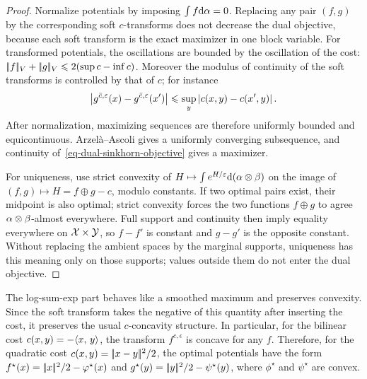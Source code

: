 \begin{proof}
	Normalize potentials by imposing $\int f\mathrm{d}\alpha=0$. Replacing any pair $(f,g)$ by the corresponding soft $c$-transforms does not decrease the dual objective, because each soft transform is the exact maximizer in one block variable. For transformed potentials, the oscillations are bounded by the oscillation of the cost:
	\(|\!| f |\!|_V+|\!| g |\!|_V \leqslant 2(\sup c-\inf c)\).
	Moreover the modulus of continuity of the soft transforms is controlled by that of $c$; for instance
	\[
		\left\lvert g^{\bar c,\varepsilon}(x)-g^{\bar c,\varepsilon}(x')\right\rvert
		\leqslant
		\sup_y\left\lvert c(x,y)-c(x',y)\right\rvert.
	\]
	After normalization, maximizing sequences are therefore uniformly bounded and equicontinuous. Arzel\`a--Ascoli gives a uniformly converging subsequence, and continuity of~\eqref{eq-dual-sinkhorn-objective} gives a maximizer.

		For uniqueness, use strict convexity of
	\(H\mapsto \int e^{H/\varepsilon}\mathrm{d}(\alpha\otimes\beta)\)
		on the image of $(f,g)\mapsto H=f\oplus g-c$, modulo constants. If two optimal pairs exist, their midpoint is also optimal; strict convexity forces the two functions $f\oplus g$ to agree $\alpha\otimes\beta$-almost everywhere. Full support and continuity then imply equality everywhere on $\mathcal{X}\times\mathcal{Y}$, so $f-f'$ is constant and $g-g'$ is the opposite constant. Without replacing the ambient spaces by the marginal supports, uniqueness has this meaning only on those supports; values outside them do not enter the dual objective.
\end{proof}

\begin{rem}\label{rem-soft-transform-convexity}
	The log-sum-exp part behaves like a smoothed maximum and preserves convexity. Since the soft transform takes the negative of this quantity after inserting the cost, it preserves the usual $c$-concavity structure. In particular, for the bilinear cost $c(x,y)=-\langle x,\,y\rangle$, the transform $f^{c,\epsilon}$ is concave for any $f$. Therefore, for the quadratic cost $c(x,y)=|\!| x-y |\!|^2/2$, the optimal potentials have the form $f^\star(x)=|\!| x |\!|^2/2-\varphi^\star(x)$ and $g^\star(y)=|\!| y |\!|^2/2-\psi^\star(y)$, where $\phi^\star$ and $\psi^\star$ are convex.
\end{rem}

